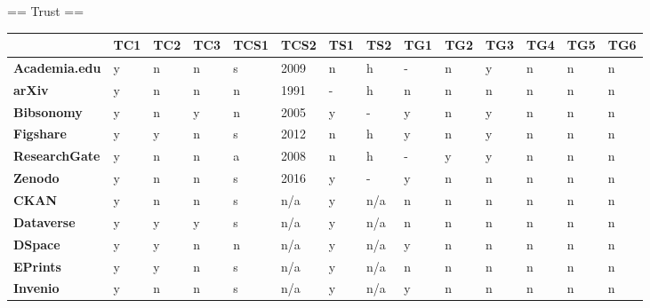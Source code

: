 == Trust ==

\begin{tabular}{|m{2.1cm}|m{0.8cm}|m{0.8cm}|m{0.8cm}|m{0.8cm}|m{0.8cm}|m{0.8cm}|m{0.8cm}|m{0.8cm}|m{0.8cm}|m{0.8cm}|m{0.8cm}|m{0.8cm}|m{0.8cm}|} \hline 
 & \textbf{TC1}  & \textbf{TC2}  & \textbf{TC3}  & \textbf{TCS1}  & \textbf{TCS2}  & \textbf{TS1}  & \textbf{TS2}  & \textbf{TG1}  & \textbf{TG2}  & \textbf{TG3}  & \textbf{TG4}  & \textbf{TG5}  & \textbf{TG6}  \\ \hline 
\textbf{Academia.edu}  &y &n &n &s &2009 &n &h &- &n &y &n &n &n \\ \hline 
\textbf{arXiv}  &y &n &n &n &1991 &- &h &n &n &n &n &n &n \\ \hline 
\textbf{Bibsonomy}  &y &n &y &n &2005 &y &- &y &n &y &n &n &n \\ \hline 
\textbf{Figshare}  &y &y &n &s &2012 &n &h &y &n &y &n &n &n \\ \hline 
\textbf{ResearchGate}  &y &n &n &a &2008 &n &h &- &y &y &n &n &n \\ \hline 
\textbf{Zenodo}  &y &n &n &s &2016 &y &- &y &n &n &n &n &n \\ \hline 
 \hline 
\textbf{CKAN}  &y &n &n &s &n/a &y &n/a &n &n &n &n &n &n \\ \hline 
\textbf{Dataverse}  &y &y &y &s &n/a &y &n/a &n &n &n &n &n &n \\ \hline 
\textbf{DSpace}  &y &y &n &n &n/a &y &n/a &y &n &n &n &n &n \\ \hline 
\textbf{EPrints}  &y &y &n &s &n/a &y &n/a &n &n &n &n &n &n \\ \hline 
\textbf{Invenio}  &y &n &n &s &n/a &y &n/a &y &n &n &n &n &n \\ \hline 
 \end{tabular}


